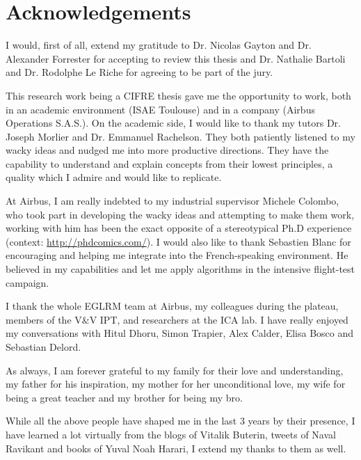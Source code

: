\chapter*{Acknowledgements}
I would, first of all, extend my gratitude to Dr. Nicolas Gayton and Dr. Alexander Forrester for accepting to review this thesis and Dr. Nathalie Bartoli and Dr. Rodolphe Le Riche for agreeing to be part of the jury. 

This research work being a CIFRE thesis gave me the opportunity to work, both in an academic environment (ISAE Toulouse) and in a company (Airbus Operations S.A.S.). On the academic side, I would like to thank my tutors Dr. Joseph Morlier and  Dr. Emmanuel Rachelson. They both patiently listened to my wacky ideas and nudged me into more productive directions. They have the capability to understand and explain concepts from their lowest principles, a quality which I admire and would like to replicate.  

At Airbus, I am really indebted to my industrial supervisor Michele Colombo, who took part in developing the wacky ideas and attempting to make them work, working with him has been the exact opposite of a stereotypical Ph.D experience (context: \url{http://phdcomics.com/}). I would also like to thank Sebastien Blanc for encouraging and helping me integrate into the French-speaking environment. He believed in my capabilities and let me apply algorithms in the intensive flight-test campaign. 

I thank the whole EGLRM team at Airbus, my colleagues during the plateau, members of the V\&V IPT, and researchers at the ICA lab. I have really enjoyed my conversations with Hitul Dhoru, Simon Trapier, Alex Calder, Elisa Bosco and Sebastian Delord. 

As always, I am forever grateful to my family for their love and understanding, my father for his inspiration, my mother for her unconditional love, my wife for being a great teacher and my brother for being my bro. 

While all the above people have shaped me in the last 3 years by their presence, I have learned a lot virtually from the blogs of Vitalik Buterin, tweets of Naval Ravikant and books of Yuval Noah Harari, I extend my thanks to them as well. 